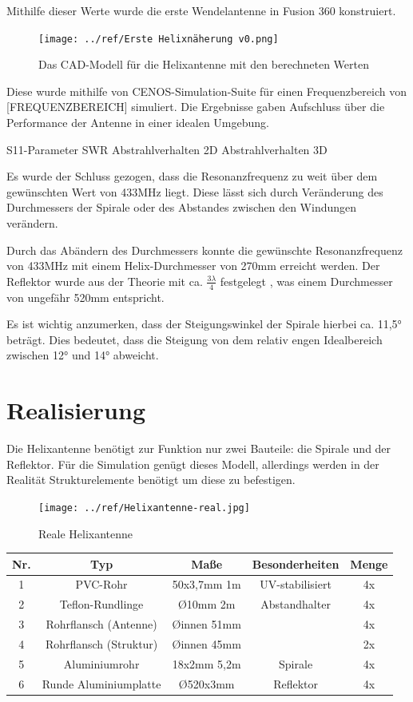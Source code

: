 Mithilfe dieser Werte wurde die erste Wendelantenne in Fusion 360 konstruiert. 

\begin{figure}[h!]
	\centering
	\texttt{[image: ../ref/Erste Helixnäherung v0.png]}
	\label{fig:ersteHelixnäherung}
	\caption{Das CAD-Modell für die Helixantenne mit den berechneten Werten}
\end{figure}

Diese wurde mithilfe von CENOS-Simulation-Suite für einen Frequenzbereich von [FREQUENZBEREICH] simuliert. Die Ergebnisse gaben Aufschluss über die Performance der Antenne in einer idealen Umgebung.

S11-Parameter
SWR
Abstrahlverhalten 2D
Abstrahlverhalten 3D

Es wurde der Schluss gezogen, dass die Resonanzfrequenz zu weit über dem gewünschten Wert von 433MHz liegt. Diese lässt sich durch Veränderung des Durchmessers der Spirale oder des Abstandes zwischen den Windungen verändern.

Durch das Abändern des Durchmessers konnte die gewünschte Resonanzfrequenz von 433MHz mit einem Helix-Durchmesser von 270mm erreicht werden. Der Reflektor wurde aus der Theorie mit ca. $\frac{3\lambda}{4}$ festgelegt \cite{Kraus-2002-AntennasB}, was einem Durchmesser von ungefähr 520mm entspricht.

Es ist wichtig anzumerken, dass der Steigungswinkel der Spirale hierbei ca. 11,5° beträgt. Dies bedeutet, dass die Steigung von dem relativ engen Idealbereich zwischen 12° und 14° abweicht.

\section{Realisierung}
Die Helixantenne benötigt zur Funktion nur zwei Bauteile: die Spirale und der Reflektor. Für die Simulation genügt dieses Modell, allerdings werden in der Realität Strukturelemente benötigt um diese zu befestigen.

\begin{figure}[H]
	\centering
	\texttt{[image: ../ref/Helixantenne-real.jpg]}
	\caption{Reale Helixantenne}
	\label{fig:helix-real}
\end{figure}

\begin{tabular}{|c|c|c|c|c|}
	\hline
	Nr. & Typ & Maße & Besonderheiten & Menge \\
	\hline
	1 & PVC-Rohr & 50x3,7mm 1m & UV-stabilisiert & 4x \\
	\hline
	2 & Teflon-Rundlinge & \O 10mm 2m & Abstandhalter & 4x \\
	\hline
	3 & Rohrflansch (Antenne) & \O innen 51mm &  & 4x \\
	\hline
	4 & Rohrflansch (Struktur) & \O innen 45mm &  & 2x \\
	\hline
	5 & Aluminiumrohr & 18x2mm 5,2m & Spirale & 4x \\
	\hline
	6 & Runde Aluminiumplatte & \O 520x3mm & Reflektor & 4x \\
	\hline
\end{tabular}

